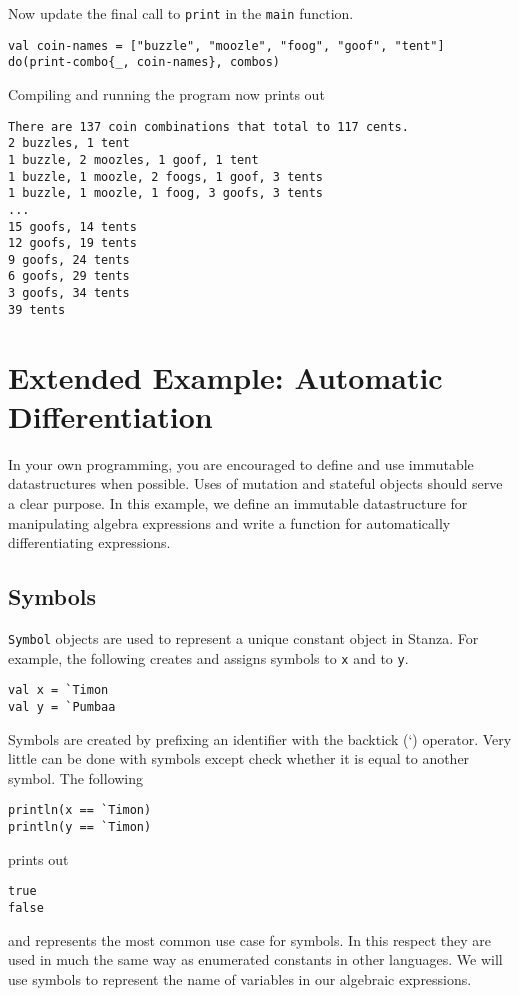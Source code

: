 \documentclass[10pt,oneside]{book}
\begin{document}
Now update the final call to \texttt{\frenchspacing print} in the \texttt{\frenchspacing main} function.
\begin{lstlisting}
val coin-names = ["buzzle", "moozle", "foog", "goof", "tent"]
do(print-combo{_, coin-names}, combos)
\end{lstlisting}
Compiling and running the program now prints out
\begin{lstlisting}
There are 137 coin combinations that total to 117 cents.
2 buzzles, 1 tent
1 buzzle, 2 moozles, 1 goof, 1 tent
1 buzzle, 1 moozle, 2 foogs, 1 goof, 3 tents
1 buzzle, 1 moozle, 1 foog, 3 goofs, 3 tents
...
15 goofs, 14 tents
12 goofs, 19 tents
9 goofs, 24 tents
6 goofs, 29 tents
3 goofs, 34 tents
39 tents
\end{lstlisting}

\section{Extended Example: Automatic Differentiation}
In your own programming, you are encouraged to define and use immutable datastructures when possible. Uses of mutation and stateful objects should serve a clear purpose. In this example, we define an immutable datastructure for manipulating algebra expressions and write a function for automatically differentiating expressions.

\subsection*{Symbols}
\texttt{\frenchspacing Symbol} objects are used to represent a unique constant object in Stanza. For example, the following creates and assigns symbols to \texttt{\frenchspacing x} and to \texttt{\frenchspacing y}.
\begin{lstlisting}
val x = `Timon
val y = `Pumbaa
\end{lstlisting}
Symbols are created by prefixing an identifier with the backtick (`) operator. Very little can be done with symbols except check whether it is equal to another symbol. The following
\begin{lstlisting}
println(x == `Timon)
println(y == `Timon)
\end{lstlisting}
prints out
\begin{lstlisting}
true
false
\end{lstlisting}
and represents the most common use case for symbols. In this respect they are used in much the same way as enumerated constants in other languages. We will use symbols to represent the name of variables in our algebraic expressions.
\end{document}
